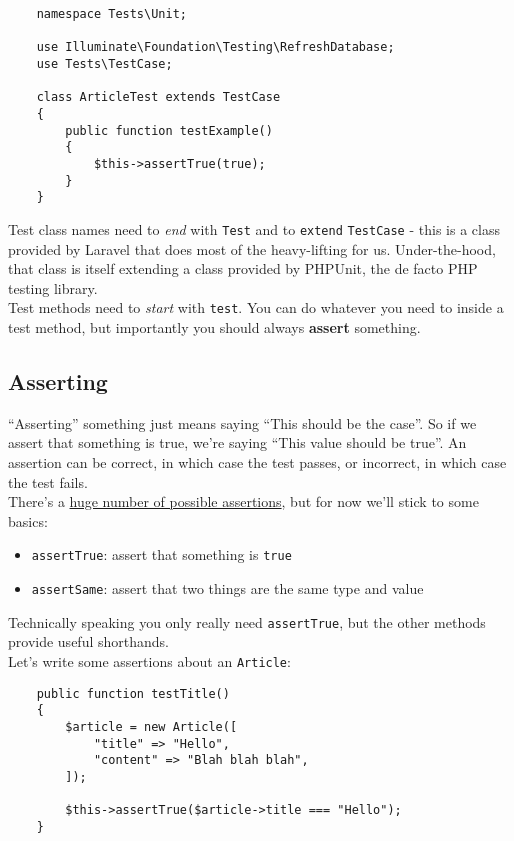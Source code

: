 \begin{verbatim}
    namespace Tests\Unit;

    use Illuminate\Foundation\Testing\RefreshDatabase;
    use Tests\TestCase;

    class ArticleTest extends TestCase
    {
        public function testExample()
        {
            $this->assertTrue(true);
        }
    }
\end{verbatim}

Test class names need to \textit{end} with \texttt{Test} and to \texttt{extend} \texttt{TestCase} - this is a class provided by Laravel that does most of the heavy-lifting for us. Under-the-hood, that class is itself extending a class provided by PHPUnit, the de facto PHP testing library.
\\

Test methods need to \textit{start} with \texttt{test}. You can do whatever you need to inside a test method, but importantly you should always \textbf{assert} something.

\subsection{Asserting}

``Asserting'' something just means saying ``This should be the case''. So if we assert that something is true, we're saying ``This value should be true''. An assertion can be correct, in which case the test passes, or incorrect, in which case the test fails.
\\

There's a \href{https://phpunit.readthedocs.io/en/9.0/assertions.html}{huge number of possible assertions}, but for now we'll stick to some basics:

\begin{itemize}
    \item \texttt{assertTrue}: assert that something is \texttt{true}
    \item \texttt{assertSame}: assert that two things are the same type and value
\end{itemize}

Technically speaking you only really need \texttt{assertTrue}, but the other methods provide useful shorthands.
\\

Let's write some assertions about an \texttt{Article}:

\begin{verbatim}
    public function testTitle()
    {
        $article = new Article([
            "title" => "Hello",
            "content" => "Blah blah blah",
        ]);

        $this->assertTrue($article->title === "Hello");
    }
\end{verbatim}


